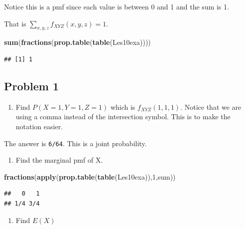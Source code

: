 \documentclass[]{book}
\newenvironment{Shaded}{\begin{snugshade}}{\end{snugshade}}
\newcommand{\KeywordTok}[1]{\textcolor[rgb]{0.13,0.29,0.53}{\textbf{#1}}}
\newcommand{\DecValTok}[1]{\textcolor[rgb]{0.00,0.00,0.81}{#1}}
\newcommand{\NormalTok}[1]{#1}
\providecommand{\tightlist}{%
  \setlength{\itemsep}{0pt}\setlength{\parskip}{0pt}}
\theoremstyle{definition}
\theoremstyle{definition}
\theoremstyle{definition}
\theoremstyle{remark}
\begin{document}
Notice this is a pmf since each value is between 0 and 1 and the sum is
1.

That is \(\sum_{x,y,z}f_{XYZ}(x,y,z)=1\).

\begin{Shaded}
\begin{Highlighting}[]
\KeywordTok{sum}\NormalTok{(}\KeywordTok{fractions}\NormalTok{(}\KeywordTok{prop.table}\NormalTok{(}\KeywordTok{table}\NormalTok{(Les10exa))))}
\end{Highlighting}
\end{Shaded}

\begin{verbatim}
## [1] 1
\end{verbatim}

\subsection{Problem 1}\label{problem-1}

\begin{enumerate}
\def\labelenumi{\arabic{enumi}.}
\tightlist
\item
  Find \(P(X=1,Y=1,Z=1)\) which is \(f_{XYZ}(1,1,1)\). Notice that we
  are using a comma instead of the intersection symbol. This is to make
  the notation easier.
\end{enumerate}

The answer is \texttt{6/64}. This is a joint probability.

\begin{enumerate}
\def\labelenumi{\arabic{enumi}.}
\setcounter{enumi}{1}
\tightlist
\item
  Find the marginal pmf of X.
\end{enumerate}

\begin{Shaded}
\begin{Highlighting}[]
\KeywordTok{fractions}\NormalTok{(}\KeywordTok{apply}\NormalTok{(}\KeywordTok{prop.table}\NormalTok{(}\KeywordTok{table}\NormalTok{(Les10exa)),}\DecValTok{1}\NormalTok{,sum))}
\end{Highlighting}
\end{Shaded}

\begin{verbatim}
##   0   1 
## 1/4 3/4
\end{verbatim}

\begin{enumerate}
\def\labelenumi{\arabic{enumi}.}
\setcounter{enumi}{2}
\tightlist
\item
  Find \(E(X)\)
\end{enumerate}
\end{document}
